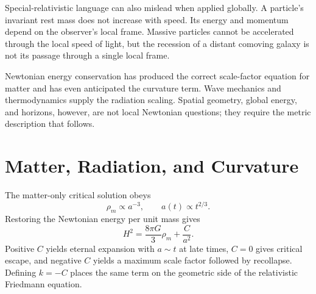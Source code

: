 Special-relativistic language can also mislead when applied globally. A particle's invariant rest mass does not increase with speed. Its energy and momentum depend on the observer's local frame. Massive particles cannot be accelerated through the local speed of light, but the recession of a distant comoving galaxy is not its passage through a single local frame.

\begin{classroomqa}
\end{classroomqa}

\begin{classroomqa}
\end{classroomqa}

Newtonian energy conservation has produced the correct scale-factor equation for matter and has even anticipated the curvature term. Wave mechanics and thermodynamics supply the radiation scaling. Spatial geometry, global energy, and horizons, however, are not local Newtonian questions; they require the metric description that follows.

\section{Matter, Radiation, and Curvature}

The matter-only critical solution obeys
\begin{equation}
\rho_m\propto a^{-3},
\qquad
a(t)\propto t^{2/3}.
\end{equation}
Restoring the Newtonian energy per unit mass gives
\begin{equation}
H^2=\frac{8\pi G}{3}\rho_m+\frac{C}{a^2}.
\end{equation}
Positive \(C\) yields eternal expansion with \(a\sim t\) at late times, \(C=0\) gives critical escape, and negative \(C\) yields a maximum scale factor followed by recollapse. Defining \(k=-C\) places the same term on the geometric side of the relativistic Friedmann equation.

